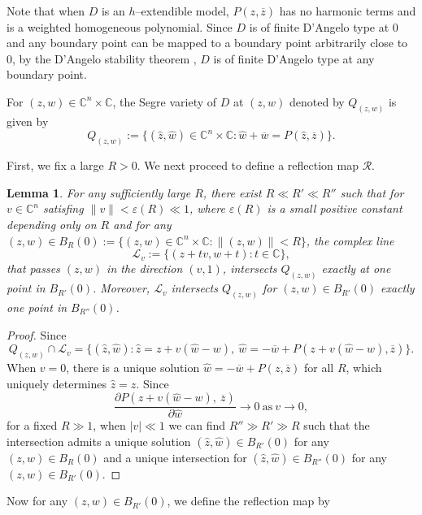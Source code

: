 \documentclass[a4paper,centertags,oneside,12pt]{amsart}
\newtheorem{lemma}[theorem]{Lemma}
\numberwithin{equation}{section}
\begin{document}
Note that when $D$ is an  $h$--extendible model,   $P(z, \overline z)$ has no harmonic terms and is a weighted homogeneous polynomial.  Since $D$ is of finite D'Angelo type at $0$ and any boundary point can be  mapped to a boundary point arbitrarily  close  to $0$, by the D'Angelo stability theorem \cite{D82}, $D$ is of finite D'Angelo type at any boundary point.


For $(z, w)\in\mathbb C^{n}\times\mathbb C$, the Segre variety of $D$ at $(z, w)$ denoted by $Q_{(z, w)}$ is given by 
$$Q_{(z, w)}:=\{(\widehat z, \widehat w)\in\mathbb C^{n}\times\mathbb C: \widehat w+\overline w=P(\widehat z, \overline z)\}.$$



First, we fix a large $R>0$. We next proceed  to define a reflection map $\mathcal R$.
\begin{lemma}
For any sufficiently large $R$, there exist $R\ll R'\ll R''$ such that for  $v\in\mathbb C^{n}$ satisfing $\|v\|<\varepsilon(R)\ll 1$, where $\varepsilon(R)$ is a small positive constant depending only on $R$ and  for any $(z, w)\in B_R(0):=\{(z, w)\in\mathbb C^{n}\times\mathbb C: \|(z, w)\|<R\}$, the complex line 
$$\mathcal L_v:=\{(z+tv, w+t): t\in\mathbb C\},$$
that passes $(z,w)$ in the direction $(v,1)$,
intersects $Q_{(z, w)}$  exactly at one point in $B_{R'}(0)$. 
Moreover, $\mathcal L_v$ intersects $Q_{(z,w)}$ for $(z,w)\in B_{R'}(0)$  exactly one point in $B_{R''}(0)$.
\end{lemma}
\begin{proof}
Since 
\begin{equation*}
Q_{(z, w)}\cap\mathcal L_v=\{(\widehat z, \widehat w):\widehat z=z+v(\widehat w-w), ~\widehat w=-\overline w+P(z+v(\widehat w-w),\overline z)\}.
\end{equation*}
When $v=0$, there is a unique solution $\widehat w=-\overline w+P(z, \overline z)$ for all $R$, which uniquely determines $\widehat z=z$. Since 
\begin{equation*}
\frac{\partial P(z+v(\widehat w-w), ~\overline z)}{\partial\widehat w}\rightarrow 0 ~\text{as}~v\rightarrow 0,
\end{equation*}
for a fixed $R\gg1$,  when $|v|\ll1$ we can find $R''\gg R'\gg R$ such that the intersection admits a unique solution $(\widehat z, \widehat w)\in B_{R'}(0)$ for any $(z, w)\in B_R(0)$ and a unique intersection for $(\widehat z, \widehat w)\in B_{R''}(0)$ for any $(z, w)\in B_{R'}(0)$.
\end{proof}
Now for any $(z, w)\in B_{R'}(0)$, we define the reflection map by
\end{document}
